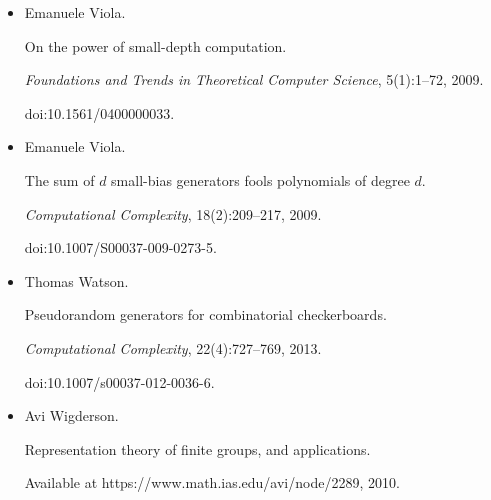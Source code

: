 \documentclass[10pt,a4paper]{article}
\begin{document}
\begin{itemize}
\emph{Foundations and Trends in Theoretical Computer Science},
7(1-3):1–336, 2012.


doi:10.1561/0400000010.





\item[] 
[50]

Emanuele Viola.


On the power of small-depth computation.


\emph{Foundations and Trends in Theoretical Computer Science},
5(1):1–72, 2009.


doi:10.1561/0400000033.





\item[] 
[51]

Emanuele Viola.


The sum of $d$ small-bias generators fools polynomials of degree $d$.


\emph{Computational Complexity}, 18(2):209–217, 2009.


doi:10.1007/S00037-009-0273-5.





\item[] 
[52]

Thomas Watson.


Pseudorandom generators for combinatorial checkerboards.


\emph{Computational Complexity}, 22(4):727–769, 2013.


doi:10.1007/s00037-012-0036-6.





\item[] 
[53]

Avi Wigderson.


Representation theory of finite groups, and applications.


Available at https://www.math.ias.edu/avi/node/2289, 2010.





\end{itemize}
\end{document}
